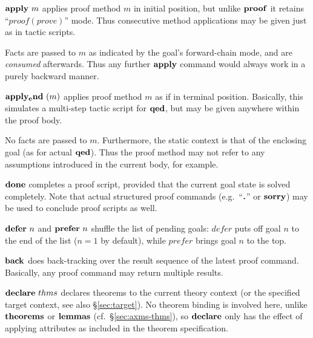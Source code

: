 \begin{descr}

\item [$\APPLY{m}$] applies proof method $m$ in initial position, but unlike
  ${\mathord{\mathbf{proof}}}$ it retains ``$proof(prove)$'' mode.  Thus consecutive method
  applications may be given just as in tactic scripts.
  
  Facts are passed to $m$ as indicated by the goal's forward-chain mode, and
  are \emph{consumed} afterwards.  Thus any further ${\mathord{\mathbf{apply}}}$ command would
  always work in a purely backward manner.
  
\item [${\mathord{\mathbf{apply_end}}}~(m)$] applies proof method $m$ as if in
  terminal position.  Basically, this simulates a multi-step tactic script for
  ${\mathord{\mathbf{qed}}}$, but may be given anywhere within the proof body.
  
  No facts are passed to $m$.  Furthermore, the static context is that of the
  enclosing goal (as for actual ${\mathord{\mathbf{qed}}}$).  Thus the proof method may not
  refer to any assumptions introduced in the current body, for example.
  
\item [${\mathord{\mathbf{done}}}$] completes a proof script, provided that the
  current goal state is solved completely.  Note that actual structured proof
  commands (e.g.\ ``$\textbf{.}$'' or ${\mathord{\mathbf{sorry}}}$) may be used to conclude proof
  scripts as well.

\item [${\mathord{\mathbf{defer}}}~n$ and ${\mathord{\mathbf{prefer}}}~n$] shuffle the list
  of pending goals: $defer$ puts off goal $n$ to the end of the list ($n = 1$
  by default), while $prefer$ brings goal $n$ to the top.
  
\item [${\mathord{\mathbf{back}}}$] does back-tracking over the result sequence of
  the latest proof command.  Basically, any proof command may return multiple
  results.
  
\item [${\mathord{\mathbf{declare}}}~thms$] declares theorems to the current
  theory context (or the specified target context, see also
  \S\ref{sec:target}).  No theorem binding is involved here, unlike
  ${\mathord{\mathbf{theorems}}}$ or ${\mathord{\mathbf{lemmas}}}$ (cf.\ 
  \S\ref{sec:axms-thms}), so ${\mathord{\mathbf{declare}}}$ only has the
  effect of applying attributes as included in the theorem
  specification.

\end{descr}

